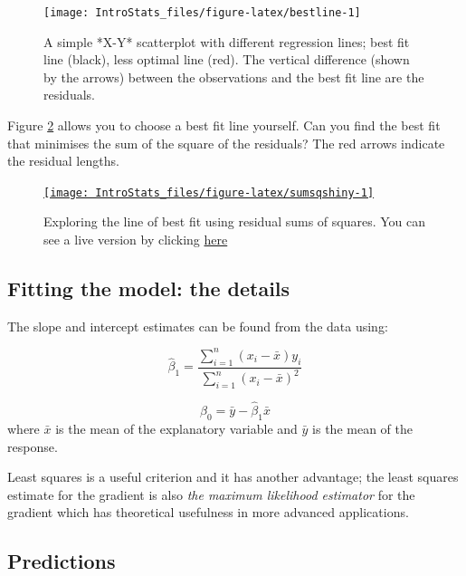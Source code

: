 \documentclass[
  oneside]{krantz}
\begin{document}
\begin{figure}

{\centering \texttt{[image: IntroStats\_files/figure-latex/bestline-1]} 

}

\caption{A simple *X-Y* scatterplot with different regression lines; best fit line (black), less optimal line (red). The vertical difference (shown by the arrows) between the observations and the best fit line are the residuals.}\label{fig:bestline}
\end{figure}

Figure \ref{fig:sumsqshiny} allows you to choose a best fit line yourself. Can you find the best fit that minimises the sum of the square of the residuals? The red arrows indicate the residual lengths.



\begin{figure}

{\centering \href{https://moniquemackenzie.shinyapps.io/IntroStats_SumsSq/}{\texttt{[image: IntroStats\_files/figure-latex/sumsqshiny-1]} }

}

\caption{Exploring the line of best fit using residual sums of squares. You can see a live version by clicking \href{https://moniquemackenzie.shinyapps.io/IntroStats_SumsSq/}{here}}\label{fig:sumsqshiny}
\end{figure}

\hypertarget{fitting-the-model-the-details}{%
\subsection{Fitting the model: the details}\label{fitting-the-model-the-details}}

The slope and intercept estimates can be found from the data using:

\[\hat{\beta}_1=\frac{\sum_{i=1}^{n}(x_i-\bar{x})y_i}{\sum_{i=1}^{n}(x_i-\bar{x})^2}\]

\[\hat{\beta}_0=\bar{y} - \hat{\beta}_1\bar{x}\]
where \(\bar{x}\) is the mean of the explanatory variable and \(\bar{y}\) is the mean of the response.

Least squares is a useful criterion and it has another advantage; the least squares estimate for the gradient is also \emph{the maximum likelihood estimator} for the gradient which has theoretical usefulness in more advanced applications.

\hypertarget{predictions}{%
\subsection{Predictions}\label{predictions}}
\end{document}
